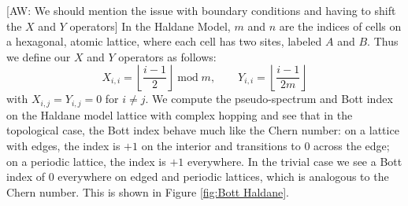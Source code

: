 \documentclass[a4paper]{article}
\newcommand{\aw}[1]{{\color{blue} [AW: #1]}}
\begin{document}
\aw{We should mention the issue with boundary conditions and having to shift the $X$ and $Y$ operators}
In the Haldane Model, $m$ and $n$ are the indices of cells on a hexagonal, atomic lattice, where each cell has two sites, labeled $A$ and $B$.
Thus we define our $X$ and $Y$ operators as follows:
$$X_{i,i} = \left\lfloor \frac{i-1}{2} \right\rfloor \;\text{mod}\;m, \quad\quad Y_{i,i} = \left\lfloor \frac{i-1}{2m} \right\rfloor$$
with $X_{i,j} = Y_{i,j} = 0$ for $i \neq j$. 
We compute the pseudo-spectrum and Bott index on the Haldane model lattice with complex hopping and see that in the topological case, the Bott index behave much like the Chern number:
on a lattice with edges, the index is $+1$ on the interior and transitions to 0 across the edge;
on a periodic lattice, the index is $+1$ everywhere.
In the trivial case we see a Bott index of 0 everywhere on edged and periodic lattices, which is analogous to the Chern number.
This is shown in Figure \ref{fig:Bott Haldane}.
\end{document}
